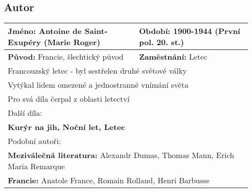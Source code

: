 \subsection*{Autor}
\begin{tabularx}{\linewidth}{l|l}
    \textbf{Jméno:} Antoine de Saint-Exupéry (Marie Roger) & \textbf{Období:} 1900-1944 (První pol. 20. st.) \\
    \hline
    \textbf{Původ:} Francie, šlechtický původ              & \textbf{Zaměstnání:} Letec                      \\
    \hline
    \multicolumn{2}{l}{Francouzský letec - byl sestřelen druhé světové války}                                \\
    \multicolumn{2}{l}{Vytýkal lidem omezené a jednostranné vnímání světa}                                   \\
    \multicolumn{2}{l}{Pro svá díla čerpal z oblasti letectví}                                               \\
    \hline
    \multicolumn{2}{l}{Další díla:}                                                                          \\
    \multicolumn{2}{l}{\textbf{Kurýr na jih, Noční let, Letec}}                                              \\
    \hline
    \multicolumn{2}{l}{Podobní autoři:}                                                                      \\
    \multicolumn{2}{l}{\textbf{Meziválečná literatura:} Alexandr Dumas, Thomas Mann, Erich Maria Remarque}   \\
    \multicolumn{2}{l}{\textbf{Francie:} Anatole France, Romain Rolland, Henri Barbusse}                     \\
\end{tabularx}
